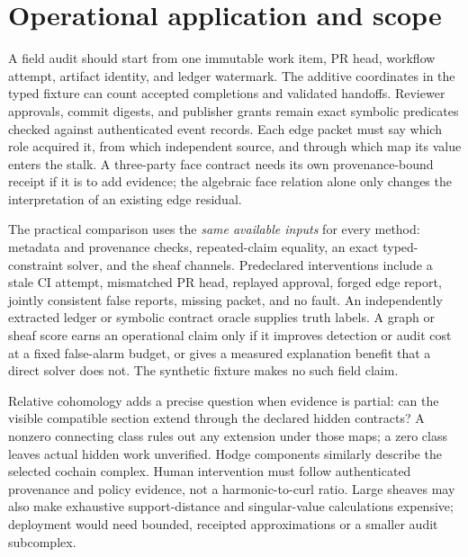 \documentclass[11pt,a4paper]{article}
\begin{document}
\section{Operational application and scope}\label{sec:application}
A field audit should start from one immutable work item, PR head, workflow attempt, artifact identity, and ledger watermark. The additive coordinates in the typed fixture can count accepted completions and validated handoffs. Reviewer approvals, commit digests, and publisher grants remain exact symbolic predicates checked against authenticated event records. Each edge packet must say which role acquired it, from which independent source, and through which map its value enters the stalk. A three-party face contract needs its own provenance-bound receipt if it is to add evidence; the algebraic face relation alone only changes the interpretation of an existing edge residual.

The practical comparison uses the \emph{same available inputs} for every method: metadata and provenance checks, repeated-claim equality, an exact typed-constraint solver, and the sheaf channels. Predeclared interventions include a stale CI attempt, mismatched PR head, replayed approval, forged edge report, jointly consistent false reports, missing packet, and no fault. An independently extracted ledger or symbolic contract oracle supplies truth labels. A graph or sheaf score earns an operational claim only if it improves detection or audit cost at a fixed false-alarm budget, or gives a measured explanation benefit that a direct solver does not. The synthetic fixture makes no such field claim.

Relative cohomology adds a precise question when evidence is partial: can the visible compatible section extend through the declared hidden contracts? A nonzero connecting class rules out any extension under those maps; a zero class leaves actual hidden work unverified. Hodge components similarly describe the selected cochain complex. Human intervention must follow authenticated provenance and policy evidence, not a harmonic-to-curl ratio. Large sheaves may also make exhaustive support-distance and singular-value calculations expensive; deployment would need bounded, receipted approximations or a smaller audit subcomplex.
\end{document}
